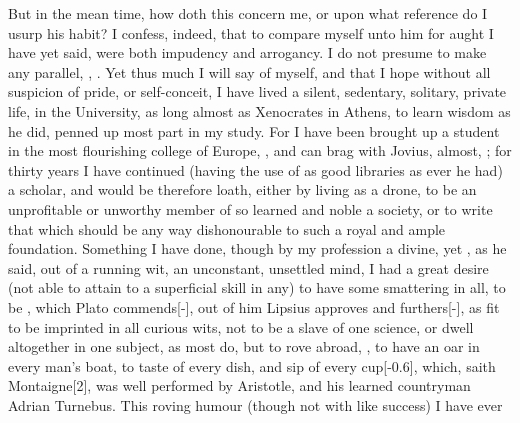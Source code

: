 {But in the mean time, how doth this concern me, or upon what reference
do I usurp his habit? I confess, indeed, that to compare myself unto
him for aught I have yet said, were both impudency and arrogancy. I do
not presume to make any parallel, , . Yet thus much I
will say of myself, and that I hope without all suspicion of pride, or
self-conceit, I have lived a silent, sedentary, solitary, private life,
 in the University, as long almost as Xenocrates in
Athens,  to learn wisdom as he did, penned up most part
in my study. For I have been brought up a student in the most
flourishing college of Europe, , and can brag
with Jovius, almost, ; for thirty years I
have continued (having the use of as good libraries as ever he had)
a scholar, and would be therefore loath, either by living as a drone,
to be an unprofitable or unworthy member of so learned and noble a
society, or to write that which should be any way dishonourable to such
a royal and ample foundation. Something I have done, though by my
profession a divine, yet , as he said, out of
a running wit, an unconstant, unsettled mind, I had a great desire (not
able to attain to a superficial skill in any) to have some smattering
in all, to be , which
Plato commends[-\baselineskip], out of him Lipsius approves and furthers[-\baselineskip], as
fit to be imprinted in all curious wits, not to be a slave of one
science, or dwell altogether in one subject, as most do, but to rove
abroad, , to have an oar in every man's boat, to 
taste of every dish, and sip of every cup[-0.6\baselineskip], which, saith Montaigne[2\baselineskip],
was well performed by Aristotle, and his learned countryman Adrian
Turnebus. This roving humour (though not with like success) I have ever
}
